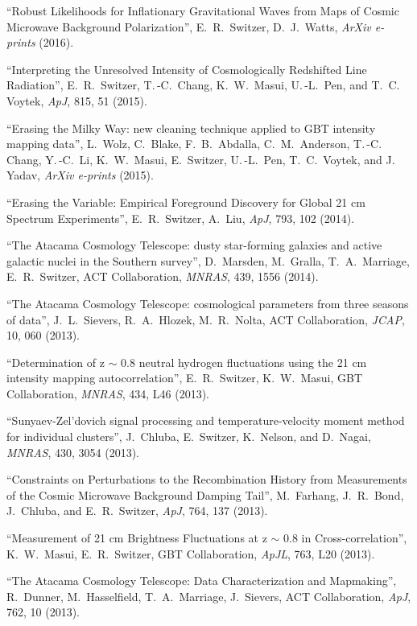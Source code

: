 \item ``Robust Likelihoods for Inflationary Gravitational Waves from Maps of Cosmic Microwave Background Polarization'', E.\, R.\, Switzer, D.\, J.\, Watts, {\it ArXiv e-prints} (2016).
\item ``Interpreting the Unresolved Intensity of Cosmologically Redshifted Line Radiation'', E.\, R.\, Switzer, T.\,-C.\, Chang, K.\, W.\, Masui, U.\,-L.\, Pen, and T.\, C.\, Voytek, {\it ApJ}, 815, 51 (2015).
\item ``Erasing the Milky Way: new cleaning technique applied to GBT intensity mapping data'', L.\, Wolz, C.\, Blake, F.\, B.\, Abdalla, C.\, M.\, Anderson, T.\,-C.\, Chang, Y.\,-C.\, Li, K.\, W.\, Masui, E.\, Switzer, U.\,-L.\, Pen, T.\, C.\, Voytek, and J.\, Yadav, {\it ArXiv e-prints} (2015).
\item ``Erasing the Variable: Empirical Foreground Discovery for Global 21 cm Spectrum Experiments'', E.\, R.\, Switzer, A.\, Liu, {\it ApJ}, 793, 102 (2014).
\item ``The Atacama Cosmology Telescope: dusty star-forming galaxies and active galactic nuclei in the Southern survey'', D.\, Marsden, M.\, Gralla, T.\, A.\, Marriage, E.\, R.\, Switzer, ACT Collaboration, {\it MNRAS}, 439, 1556 (2014).
\item ``The Atacama Cosmology Telescope: cosmological parameters from three seasons of data'', J.\, L.\, Sievers, R.\, A.\, Hlozek, M.\, R.\, Nolta, ACT Collaboration, {\it JCAP}, 10, 060 (2013).
\item ``Determination of z $\sim$ 0.8 neutral hydrogen fluctuations using the 21 cm intensity mapping autocorrelation'', E.\, R.\, Switzer, K.\, W.\, Masui, GBT Collaboration, {\it MNRAS}, 434, L46 (2013).
\item ``Sunyaev-Zel'dovich signal processing and temperature-velocity moment method for individual clusters'', J.\, Chluba, E.\, Switzer, K.\, Nelson, and D.\, Nagai, {\it MNRAS}, 430, 3054 (2013).
\item ``Constraints on Perturbations to the Recombination History from Measurements of the Cosmic Microwave Background Damping Tail'', M.\, Farhang, J.\, R.\, Bond, J.\, Chluba, and E.\, R.\, Switzer, {\it ApJ}, 764, 137 (2013).
\item ``Measurement of 21 cm Brightness Fluctuations at z $\sim$ 0.8 in Cross-correlation'', K.\, W.\, Masui, E.\, R.\, Switzer, GBT Collaboration, {\it ApJL}, 763, L20 (2013).
\item ``The Atacama Cosmology Telescope: Data Characterization and Mapmaking'', R.\, Dunner, M.\, Hasselfield, T.\, A.\, Marriage, J.\, Sievers, ACT Collaboration, {\it ApJ}, 762, 10 (2013).
